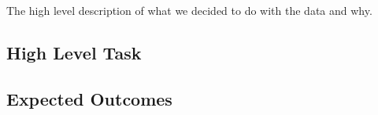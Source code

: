 
The high level description of what we decided to do with the data and why.

\subsection{High Level Task}

\subsection{Expected Outcomes}

